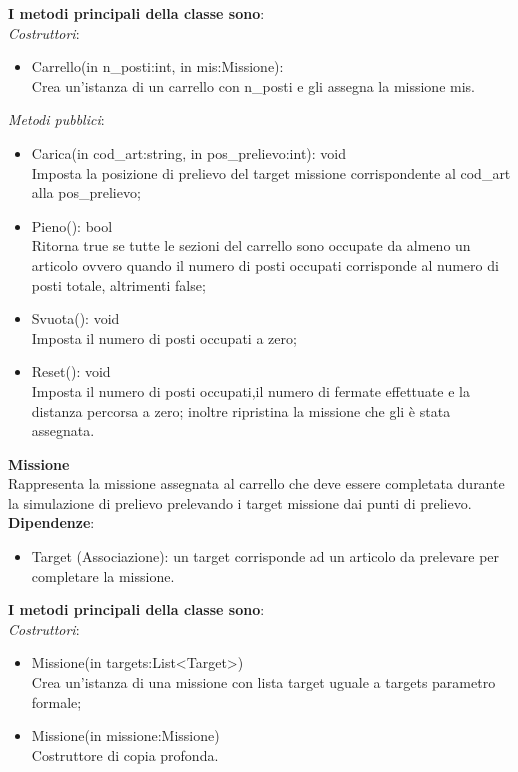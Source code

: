 \textbf{I metodi principali della classe sono}:\\
\textit{Costruttori}:\\
\begin{itemize}
    \item Carrello(in n\_posti:int, in mis:Missione):\\
    Crea un'istanza di un carrello con n\_posti e gli assegna la missione mis.\\
\end{itemize}
\textit{Metodi pubblici}:\\
\begin{itemize}
    \item Carica(in cod\_art:string, in pos\_prelievo:int): void\\
    Imposta la posizione di prelievo del target missione corrispondente al cod\_art alla pos\_prelievo;
    \item Pieno(): bool\\
    Ritorna true se tutte le sezioni del carrello sono occupate da almeno un articolo ovvero quando il numero di posti occupati 
    corrisponde al numero di posti totale, altrimenti false;
    \item Svuota(): void\\
    Imposta il numero di posti occupati a zero;
    \item Reset(): void\\  
    Imposta il numero di posti occupati,il numero di fermate effettuate e la distanza percorsa a zero; inoltre ripristina la missione che gli è stata assegnata.\\
\end{itemize} 
\textbf{Missione}\\
Rappresenta la missione assegnata al carrello che deve essere completata durante la simulazione di prelievo prelevando i target missione dai punti di prelievo.\\
\textbf{Dipendenze}:
\begin{itemize}
    \item Target (Associazione): un target corrisponde ad un articolo da prelevare per completare la missione.
\end{itemize}
\textbf{I metodi principali della classe sono}:\\
\textit{Costruttori}:\\
\begin{itemize}
    \item Missione(in targets:List<Target>)\\
    Crea un'istanza di una missione con lista target uguale a targets parametro formale;
    \item Missione(in missione:Missione)\\
    Costruttore di copia profonda.\\
\end{itemize}
